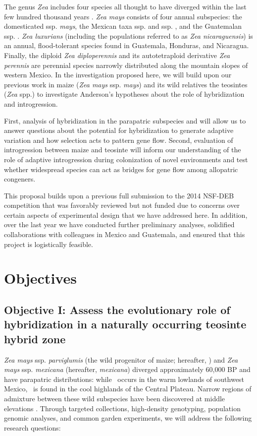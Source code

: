 The genus \emph{Zea} includes four species all thought to have diverged within the last few hundred thousand years \citep{Ross-Ibarra2009a}. \emph{Zea mays} consists of four annual subspecies: the domesticated ssp. \emph{mays}, the Mexican taxa ssp. \zp{} and ssp. \zm{}, and the Guatemalan ssp. \zh. \emph{Zea luxurians} (including the populations referred to as \emph{Zea nicaraguensis}) is an annual, flood-tolerant species found in Guatemala, Honduras, and Nicaragua. 
Finally, the diploid \emph{Zea diploperennis} and its autotetraploid derivative \emph{Zea perennis} are perennial species narrowly distributed along the mountain slopes of western Mexico. 
In the investigation proposed here, we will build upon our previous work in maize (\emph{Zea mays} ssp. \emph{mays}) and its wild relatives the teosintes (\emph{Zea} spp.) to investigate Anderson's \citeyearpar{Anderson1954} hypotheses about the role of hybridization and introgression. 

First, analysis of hybridization in the parapatric subspecies \zp{} and \zm{} will allow us to answer questions about the potential for hybridization to generate adaptive variation and how selection acts to pattern gene flow.
Second, evaluation of introgression between maize and teosinte will inform our understanding of the role of adaptive introgression during colonization of novel environments and test whether widespread species can act as bridges for gene flow among allopatric congeners.

This proposal builds upon a previous full submission to the 2014 NSF-DEB competition that was favorably reviewed but not funded due to concerns over certain aspects of experimental design that we have addressed here.
In addition, over the last year we have conducted further preliminary analyses, solidified collaborations with colleagues in Mexico and Guatemala, and ensured that this project is logistically feasible.

\section*{Objectives}
\subsection*{Objective I: Assess the evolutionary role of hybridization in a naturally occurring teosinte hybrid zone}
\emph{Zea mays} ssp. \emph{parviglumis} (the wild progenitor of maize; hereafter, \zp) and \emph{Zea mays} ssp. \emph{mexicana} (hereafter, \emph{mexicana}) diverged approximately 60,000 BP \citep{Ross-Ibarra2009a} and have parapatric distributions: while \zp\ occurs in the warm lowlands of southwest Mexico, \zm\  is found in the cool highlands of the Central Plateau. 
Narrow regions of admixture between these wild subspecies have been discovered at middle elevations \citep{Fukunaga2005, Pyhajarvi2013}. 
Through targeted collections, high-density genotyping, population genomic analyses, and common garden experiments, we will address the following research questions: 

